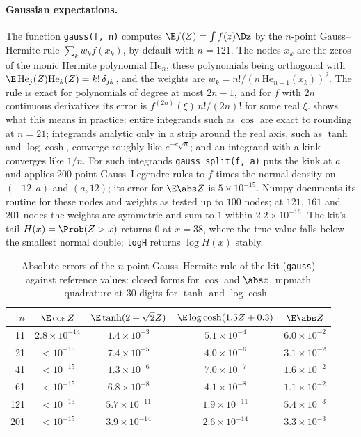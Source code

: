 \begin{refsection}
\paragraph{Gaussian expectations.} The function \texttt{gauss(f, n)} computes $\E f(Z)=\int f(z)\Dz$ by the $n$-point Gauss--Hermite rule $\sum_kw_kf(x_k)$, by default with $n=121$. The nodes $x_k$ are the zeros of the monic Hermite polynomial $\mathrm{He}_n$, these polynomials being orthogonal with $\E\,\mathrm{He}_j(Z)\mathrm{He}_k(Z)=k!\,\delta_{jk}$, and the weights are $w_k=n!/(n\,\mathrm{He}_{n-1}(x_k))^2$. The rule is exact for polynomials of degree at most $2n-1$, and for $f$ with $2n$ continuous derivatives its error is $f^{(2n)}(\xi)\,n!/(2n)!$ for some real $\xi$.  shows what this means in practice: entire integrands such as $\cos$ are exact to rounding at $n=21$; integrands analytic only in a strip around the real axis, such as $\tanh$ and $\log\cosh$, converge roughly like $e^{-c\sqrt n}$; and an integrand with a kink converges like $1/n$. For such integrands \texttt{gauss\_\allowbreak split(f, a)} puts the kink at $a$ and applies $200$-point Gauss--Legendre rules to $f$ times the normal density on $(-12,a)$ and $(a,12)$; its error for $\E\abs Z$ is $5\times10^{-15}$. Numpy documents its routine for these nodes and weights as tested up to $100$ nodes; at $121$, $161$ and $201$ nodes the weights are symmetric and sum to $1$ within $2.2\times10^{-16}$. The kit's tail $H(x)=\Prob(Z>x)$ returns $0$ at $x=38$, where the true value falls below the smallest normal double; \texttt{logH} returns $\log H(x)$ stably.

\begin{table}[t]
\centering\small
\begin{tabular}{rcccc}
\toprule
$n$ & $\E\cos Z$ & $\E\tanh(2+\sqrt2Z)$ & $\E\log\cosh(1.5Z+0.3)$ & $\E\abs Z$\\
\midrule
11 & $2.8\times10^{-14}$ & $1.4\times10^{-3}$ & $5.1\times10^{-4}$ & $6.0\times10^{-2}$\\
21 & $<10^{-15}$ & $7.4\times10^{-5}$ & $4.0\times10^{-6}$ & $3.1\times10^{-2}$\\
41 & $<10^{-15}$ & $1.3\times10^{-6}$ & $7.0\times10^{-7}$ & $1.6\times10^{-2}$\\
61 & $<10^{-15}$ & $6.8\times10^{-8}$ & $4.1\times10^{-8}$ & $1.1\times10^{-2}$\\
121 & $<10^{-15}$ & $5.7\times10^{-11}$ & $1.9\times10^{-11}$ & $5.4\times10^{-3}$\\
201 & $<10^{-15}$ & $3.9\times10^{-14}$ & $2.6\times10^{-14}$ & $3.3\times10^{-3}$\\
\bottomrule
\end{tabular}
\caption{Absolute errors of the $n$-point Gauss--Hermite rule of the kit (\texttt{gauss}) against reference values: closed forms for $\cos$ and $\abs z$, mpmath quadrature at 30 digits for $\tanh$ and $\log\cosh$.}\label{tab:toolkit:quadrature}
\end{table}


\end{refsection}
